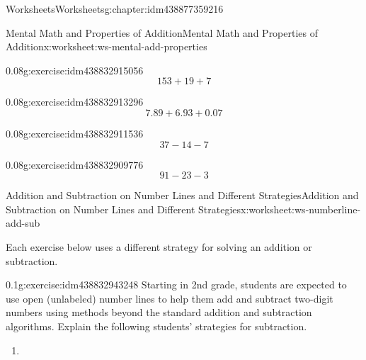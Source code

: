 \documentclass[twoside,11pt,]{book}
\begin{document}
\begin{chapterptx}{Worksheets}{}{Worksheets}{}{}{g:chapter:idm438877359216}
\begin{worksheet-section-numberless}{Mental Math and Properties of Addition}{}{Mental Math and Properties of Addition}{}{}{x:worksheet:ws-mental-add-properties}
\begin{divisionexercise}{3}{}{0.08}{g:exercise:idm438832915056}
%
\begin{equation*}
153+19+7
\end{equation*}
%
\end{divisionexercise}%
\begin{divisionexercise}{4}{}{0.08}{g:exercise:idm438832913296}%
%
\begin{equation*}
7.89+6.93+0.07
\end{equation*}
%
\end{divisionexercise}%
\begin{divisionexercise}{5}{}{0.08}{g:exercise:idm438832911536}%
%
\begin{equation*}
37-14-7
\end{equation*}
%
\end{divisionexercise}%
\begin{divisionexercise}{6}{}{0.08}{g:exercise:idm438832909776}%
%
\begin{equation*}
91-23-3
\end{equation*}
%
\end{divisionexercise}%
\end{worksheet-section-numberless}
\restoregeometry
%
%
\typeout{************************************************}
\typeout{************************************************}
%
\begin{worksheet-section-numberless}{Addition and Subtraction on Number Lines and Different Strategies}{}{Addition and Subtraction on Number Lines and Different Strategies}{}{}{x:worksheet:ws-numberline-add-sub}
\begin{introduction}{}%
Each exercise below uses a different strategy for solving an addition or subtraction.%
\end{introduction}%
\begin{divisionexercise}{1}{}{0.1}{g:exercise:idm438832943248}%
Starting in 2nd grade, students are expected to use open (unlabeled) number lines to help them add and subtract two-digit numbers using methods beyond the standard addition and subtraction algorithms.   Explain the following students’ strategies for subtraction.%
\leavevmode%
\begin{enumerate}[label=(\alph*)]
\item{} \begin{image}{0}{1}{0}%

\end{image}
\end{enumerate}
\end{divisionexercise}
\end{worksheet-section-numberless}
\end{chapterptx}
\end{document}
